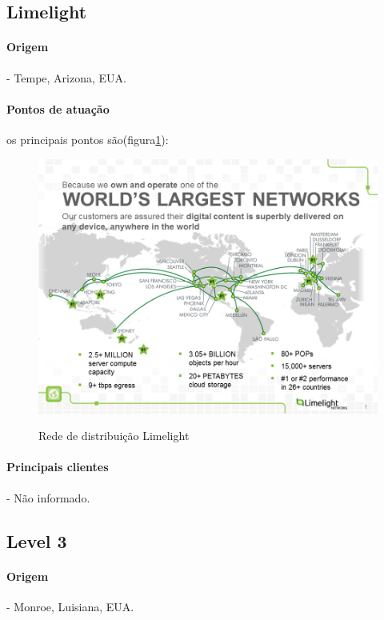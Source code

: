 \subsection{Limelight}
\paragraph{Origem}- Tempe, Arizona, EUA.
\paragraph{Pontos de atua\c{c}\~ao}os principais pontos s\~ao(figura\ref{figura:limelight_map}):
\begin{figure}[H]
\caption{Rede de distribui\c{c}\~ao Limelight}
\includegraphics[width=14cm]{Figuras/limelight_map.png} 
\label{figura:limelight_map}
\end{figure}
\paragraph{Principais clientes}- N\~ao informado.
\subsection{Level 3}
\paragraph{Origem}- Monroe, Luisiana, EUA. 
